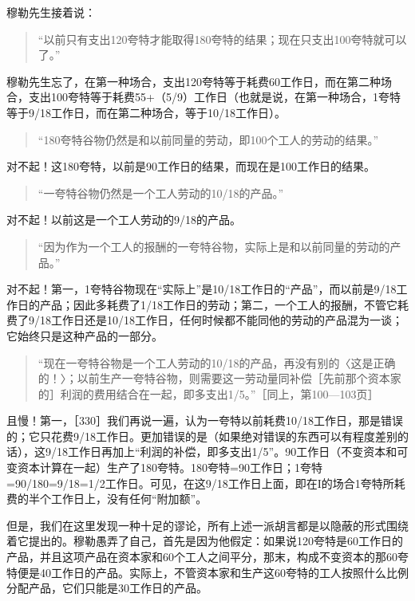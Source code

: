 穆勒先生接着说：

\begin{quote}{“以前只有支出120夸特才能取得180夸特的结果；现在只支出100夸特就可以了。”}\end{quote}

穆勒先生忘了，在第一种场合，支出120夸特等于耗费60工作日，而在第二种场合，支出100夸特等于耗费55+（5/9）工作日（也就是说，在第一种场合，1夸特等于9/18工作日，而在第二种场合，等于10/18工作日）。

\begin{quote}{“180夸特谷物仍然是和以前同量的劳动，即100个工人的劳动的结果。”}\end{quote}

对不起！这180夸特，以前是90工作日的结果，而现在是100工作日的结果。

\begin{quote}{“一夸特谷物仍然是一个工人劳动的10/18的产品。”}\end{quote}

对不起！以前这是一个工人劳动的9/18的产品。

\begin{quote}{“因为作为一个工人的报酬的一夸特谷物，实际上是和以前同量的劳动的产品。”}\end{quote}

对不起！第一，1夸特谷物现在“实际上”是10/18工作日的“产品”，而以前是9/18工作日的产品；因此多耗费了1/18工作日的劳动；第二，一个工人的报酬，不管它耗费了9/18工作日还是10/18工作日，任何时候都不能同他的劳动的产品混为一谈；它始终只是这种产品的一部分。

\begin{quote}{“现在一夸特谷物是一个工人劳动的10/18的产品，再没有别的〈这是正确的！〉；以前生产一夸特谷物，则需要这一劳动量同补偿［先前那个资本家的］利润的费用结合在一起，即多支出1/5。”［同上，第100—103页］}\end{quote}

且慢！第一，［330］我们再说一遍，认为一夸特以前耗费10/18工作日，那是错误的；它只花费9/18工作日。更加错误的是（如果绝对错误的东西可以有程度差别的话），这9/18工作日再加上“利润的补偿，即多支出1/5”。90工作日（不变资本和可变资本计算在一起）生产了180夸特。180夸特=90工作日；1夸特=90/180=9/18=1/2工作日。可见，在这9/18工作日上面，即在I的场合1夸特所耗费的半个工作日上，没有任何“附加额”。

但是，我们在这里发现一种十足的谬论，所有上述一派胡言都是以隐蔽的形式围绕着它提出的。穆勒愚弄了自己，首先是因为他假定：如果说120夸特是60工作日的产品，并且这项产品在资本家和60个工人之间平分，那末，构成不变资本的那60夸特便是40工作日的产品。实际上，不管资本家和生产这60夸特的工人按照什么比例分配产品，它们只能是30工作日的产品。

